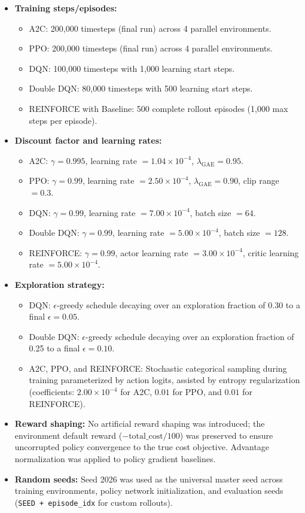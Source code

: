 \documentclass[11pt,a4paper]{article}
\begin{document}
\begin{itemize}
    \item \textbf{Training steps/episodes:}
    \begin{itemize}
        \item A2C: 200,000 timesteps (final run) across 4 parallel environments.
        \item PPO: 200,000 timesteps (final run) across 4 parallel environments.
        \item DQN: 100,000 timesteps with 1,000 learning start steps.
        \item Double DQN: 80,000 timesteps with 500 learning start steps.
        \item REINFORCE with Baseline: 500 complete rollout episodes (1,000 max steps per episode).
    \end{itemize}
    \item \textbf{Discount factor and learning rates:}
    \begin{itemize}
        \item A2C: $\gamma = 0.995$, learning rate $= 1.04 \times 10^{-4}$, $\lambda_{\text{GAE}} = 0.95$.
        \item PPO: $\gamma = 0.99$, learning rate $= 2.50 \times 10^{-4}$, $\lambda_{\text{GAE}} = 0.90$, clip range $= 0.3$.
        \item DQN: $\gamma = 0.99$, learning rate $= 7.00 \times 10^{-4}$, batch size $= 64$.
        \item Double DQN: $\gamma = 0.99$, learning rate $= 5.00 \times 10^{-4}$, batch size $= 128$.
        \item REINFORCE: $\gamma = 0.99$, actor learning rate $= 3.00 \times 10^{-4}$, critic learning rate $= 5.00 \times 10^{-4}$.
    \end{itemize}
    \item \textbf{Exploration strategy:}
    \begin{itemize}
        \item DQN: $\epsilon$-greedy schedule decaying over an exploration fraction of 0.30 to a final $\epsilon = 0.05$.
        \item Double DQN: $\epsilon$-greedy schedule decaying over an exploration fraction of 0.25 to a final $\epsilon = 0.10$.
        \item A2C, PPO, and REINFORCE: Stochastic categorical sampling during training parameterized by action logits, assisted by entropy regularization (coefficients: $2.00 \times 10^{-4}$ for A2C, $0.01$ for PPO, and $0.01$ for REINFORCE).
    \end{itemize}
    \item \textbf{Reward shaping:} No artificial reward shaping was introduced; the environment default reward ($-\text{total\_cost} / 100$) was preserved to ensure uncorrupted policy convergence to the true cost objective. Advantage normalization was applied to policy gradient baselines.
    \item \textbf{Random seeds:} Seed 2026 was used as the universal master seed across training environments, policy network initialization, and evaluation seeds (\texttt{SEED + episode\_idx} for custom rollouts).
\end{itemize}
\end{document}
